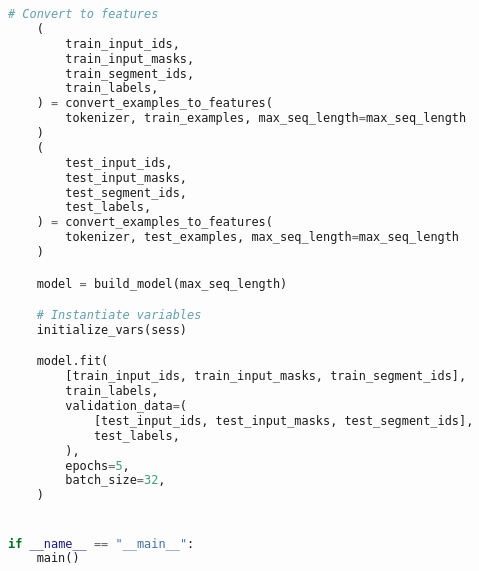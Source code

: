 \begin{lstlisting}[language=Python, caption=My attempt to adapt BERT to short text classification]
    # Convert to features
    (
        train_input_ids,
        train_input_masks,
        train_segment_ids,
        train_labels,
    ) = convert_examples_to_features(
        tokenizer, train_examples, max_seq_length=max_seq_length
    )
    (
        test_input_ids,
        test_input_masks,
        test_segment_ids,
        test_labels,
    ) = convert_examples_to_features(
        tokenizer, test_examples, max_seq_length=max_seq_length
    )

    model = build_model(max_seq_length)

    # Instantiate variables
    initialize_vars(sess)

    model.fit(
        [train_input_ids, train_input_masks, train_segment_ids],
        train_labels,
        validation_data=(
            [test_input_ids, test_input_masks, test_segment_ids],
            test_labels,
        ),
        epochs=5,
        batch_size=32,
    )


if __name__ == "__main__":
    main()

\end{lstlisting}
